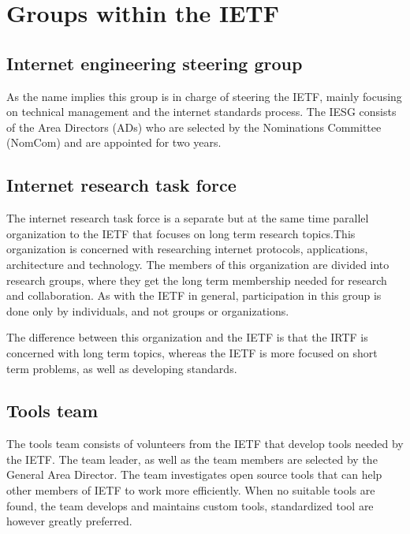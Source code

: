 \documentclass{report}
\begin{document}
\chapter{Groups within the IETF}
	\section{Internet engineering steering group}
	As the name implies this group is in charge of steering the IETF, mainly focusing on technical management and the internet standards process. The IESG consists of the Area Directors (ADs) who are selected by the Nominations Committee (NomCom) and are appointed for two years.

\section{Internet research task force}
The internet research task force is a separate but at the same time parallel organization to the IETF  that focuses on long term research topics.This organization is concerned with researching internet protocols, applications, architecture and technology. The members of this organization are divided into research groups, where they get the long term membership needed for research and collaboration. As with the IETF in general, participation in this group is done only by individuals, and not groups or organizations.

The difference between this organization and the IETF is that the IRTF is concerned with long term topics, whereas the IETF is more focused on short term problems, as well as developing standards.


\section{Tools team}

The tools team consists of volunteers from the IETF that develop tools needed by the IETF. The team leader, as well as the team members are selected by the General Area Director.
The team investigates open source tools that can help other members of IETF to work more efficiently. When no suitable tools are found, the team develops and maintains custom tools, standardized tool are however greatly preferred.
\end{document}
